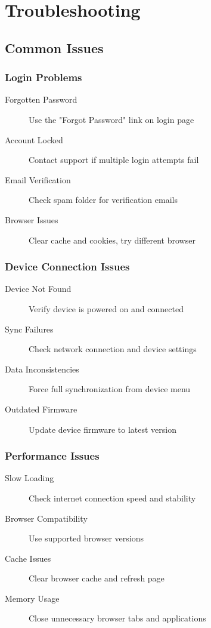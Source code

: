 \chapter{Troubleshooting}

\section{Common Issues}

\subsection{Login Problems}

\begin{description}
    \item[Forgotten Password] Use the "Forgot Password" link on login page
    \item[Account Locked] Contact support if multiple login attempts fail
    \item[Email Verification] Check spam folder for verification emails
    \item[Browser Issues] Clear cache and cookies, try different browser
\end{description}

\subsection{Device Connection Issues}

\begin{description}
    \item[Device Not Found] Verify device is powered on and connected
    \item[Sync Failures] Check network connection and device settings
    \item[Data Inconsistencies] Force full synchronization from device menu
    \item[Outdated Firmware] Update device firmware to latest version
\end{description}

\subsection{Performance Issues}

\begin{description}
    \item[Slow Loading] Check internet connection speed and stability
    \item[Browser Compatibility] Use supported browser versions
    \item[Cache Issues] Clear browser cache and refresh page
    \item[Memory Usage] Close unnecessary browser tabs and applications
\end{description}

